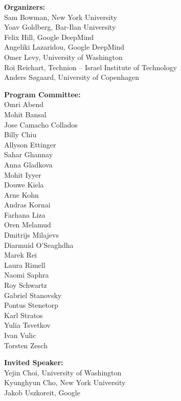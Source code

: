 \documentclass[11pt]{article}
\begin{document}

\vspace*{0.5cm}


\begin{description}
\item{\bf Organizers:}\vspace{2mm} \\
Sam Bowman, New York University \\
Yoav Goldberg, Bar-Ilan University \\
Felix Hill, Google DeepMind \\
Angeliki Lazaridou, Google DeepMind \\
Omer Levy, University of Washington \\
Roi Reichart, Technion -- Israel Institute of Technology \\
Anders S{\o}gaard, University of Copenhagen \\

\vspace{3mm}
\item{\bf Program Committee:}\vspace{2mm} \\
Omri Abend \\
Mohit Bansal \\
Jose Camacho Collados \\
Billy Chiu \\
Allyson Ettinger \\
Sahar Ghannay \\
Anna Gladkova \\
Mohit Iyyer \\
Douwe Kiela \\
Arne Kohn \\
Andras Kornai \\
Farhana Liza \\
Oren Melamud \\
Dmitrijs Milajevs \\
Diarmuid O’Seaghdha \\
Marek Rei \\
Laura Rimell \\
Naomi Saphra \\
Roy Schwartz \\
Gabriel Stanovsky \\
Pontus Stenetorp \\
Karl Stratos \\
Yulia Tsvetkov \\
Ivan Vulic \\
Torsten Zesch \\

\vspace{3mm}
\item{\bf Invited Speaker:}\vspace{2mm} \\
Yejin Choi, University of Washington \\
Kyunghyun Cho, New York University \\
Jakob Uszkoreit, Google \\



\end{description}
\end{document}
